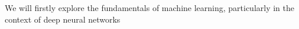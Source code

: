 We will firstly explore the fundamentals of machine learning, particularly in the context of deep neural networks